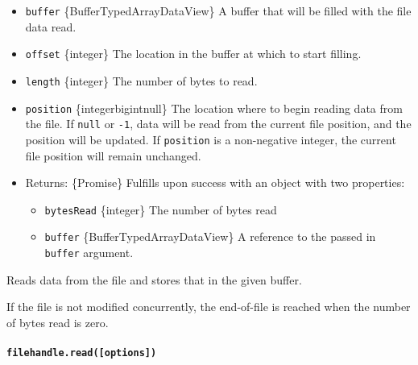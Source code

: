 \begin{itemize}
\tightlist
\item
  \texttt{buffer} \{Buffer\textbar TypedArray\textbar DataView\} A
  buffer that will be filled with the file data read.
\item
  \texttt{offset} \{integer\} The location in the buffer at which to
  start filling.
\item
  \texttt{length} \{integer\} The number of bytes to read.
\item
  \texttt{position} \{integer\textbar bigint\textbar null\} The location
  where to begin reading data from the file. If \texttt{null} or
  \texttt{-1}, data will be read from the current file position, and the
  position will be updated. If \texttt{position} is a non-negative
  integer, the current file position will remain unchanged.
\item
  Returns: \{Promise\} Fulfills upon success with an object with two
  properties:

  \begin{itemize}
  \tightlist
  \item
    \texttt{bytesRead} \{integer\} The number of bytes read
  \item
    \texttt{buffer} \{Buffer\textbar TypedArray\textbar DataView\} A
    reference to the passed in \texttt{buffer} argument.
  \end{itemize}
\end{itemize}

Reads data from the file and stores that in the given buffer.

If the file is not modified concurrently, the end-of-file is reached
when the number of bytes read is zero.

\paragraph{\texorpdfstring{\texttt{filehandle.read({[}options{]})}}{filehandle.read({[}options{]})}}\label{filehandle.readoptions}

